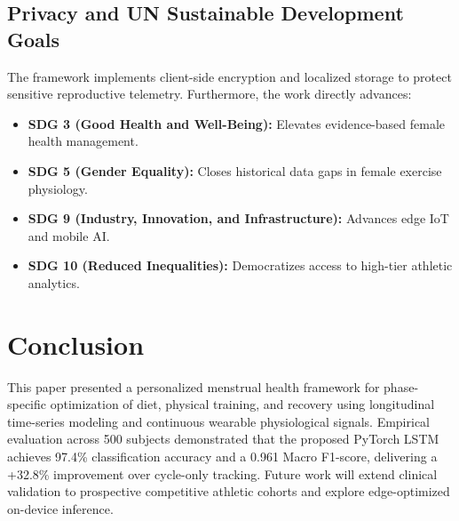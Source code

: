 \documentclass[conference]{IEEEtran}
\begin{document}
\subsection{Privacy and UN Sustainable Development Goals}
The framework implements client-side encryption and localized storage to protect sensitive reproductive telemetry. Furthermore, the work directly advances:
\begin{itemize}
    \item \textbf{SDG 3 (Good Health and Well-Being):} Elevates evidence-based female health management.
    \item \textbf{SDG 5 (Gender Equality):} Closes historical data gaps in female exercise physiology.
    \item \textbf{SDG 9 (Industry, Innovation, and Infrastructure):} Advances edge IoT and mobile AI.
    \item \textbf{SDG 10 (Reduced Inequalities):} Democratizes access to high-tier athletic analytics.
\end{itemize}

\section{Conclusion}
This paper presented a personalized menstrual health framework for phase-specific optimization of diet, physical training, and recovery using longitudinal time-series modeling and continuous wearable physiological signals. Empirical evaluation across 500 subjects demonstrated that the proposed PyTorch LSTM achieves 97.4\% classification accuracy and a 0.961 Macro F1-score, delivering a +32.8\% improvement over cycle-only tracking. Future work will extend clinical validation to prospective competitive athletic cohorts and explore edge-optimized on-device inference.
\end{document}
